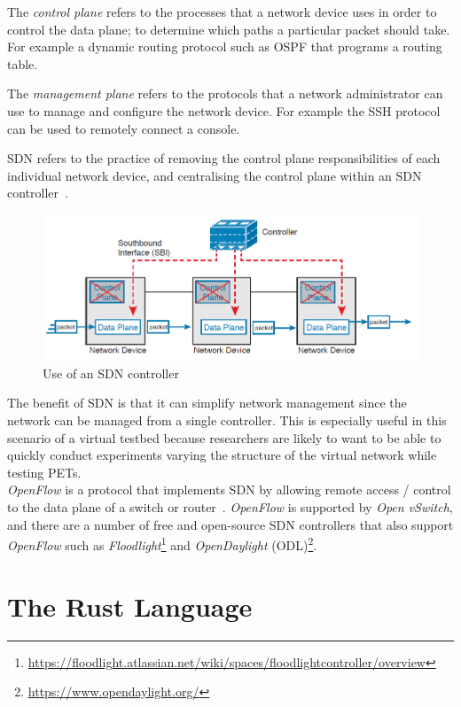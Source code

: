 \documentclass[
    author={Jacob Daniel Halsey},
    supervisor={Prof. Awais Rashid},
    degree={BSc},
    title={Building a Testbed for Evaluating Privacy Enhancing Technologies  (PETs)},
    subtitle={},
    type={software development},
    year={2021}
]{dissertation}
\begin{document}
The \emph{control plane} refers to the processes that a network device uses in order to control
the data plane; to determine which paths a particular packet should take. For example a
dynamic routing protocol such as OSPF that programs a routing table.

The \emph{management plane} refers to the protocols that a network administrator can
use to manage and configure the network device. For example the SSH protocol can be used
to remotely connect a console.

SDN refers to the practice of removing the control plane responsibilities of each individual
network device, and centralising the control plane within an 
SDN controller~\cite[760]{odom_2016_ccna}.\\

\begin{figure}
	\centering
	\includegraphics[width=12cm]{img/sdn}
	\caption{Use of an SDN controller~\cite[767]{odom_2016_ccna}}
	\label{fig:sdn_diagram}
\end{figure}

The benefit of SDN is that it can simplify network management since the network can be 
managed from a single controller. This is especially useful in this scenario of 
a virtual testbed because researchers are likely to want to be able to quickly conduct experiments 
varying the structure of the virtual network while testing PETs.\\

\emph{OpenFlow} is a protocol that implements SDN by allowing remote access / control to the data plane
of a switch or router~\cite{openflow}. \emph{OpenFlow} is supported by \emph{Open vSwitch}, and there
are a number of free and open-source SDN controllers that also support \emph{OpenFlow} such as
\emph{Floodlight}\footnote{\url{https://floodlight.atlassian.net/wiki/spaces/floodlightcontroller/overview}}
and \emph{OpenDaylight} (ODL)\footnote{\url{https://www.opendaylight.org/}}.

\section{The Rust Language}
\end{document}
